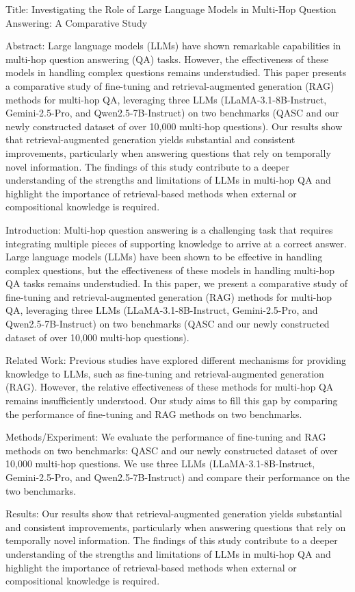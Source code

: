 Title: Investigating the Role of Large Language Models in Multi-Hop Question Answering: A Comparative Study

Abstract:
Large language models (LLMs) have shown remarkable capabilities in multi-hop question answering (QA) tasks. However, the effectiveness of these models in handling complex questions remains understudied. This paper presents a comparative study of fine-tuning and retrieval-augmented generation (RAG) methods for multi-hop QA, leveraging three LLMs (LLaMA-3.1-8B-Instruct, Gemini-2.5-Pro, and Qwen2.5-7B-Instruct) on two benchmarks (QASC and our newly constructed dataset of over 10,000 multi-hop questions). Our results show that retrieval-augmented generation yields substantial and consistent improvements, particularly when answering questions that rely on temporally novel information. The findings of this study contribute to a deeper understanding of the strengths and limitations of LLMs in multi-hop QA and highlight the importance of retrieval-based methods when external or compositional knowledge is required.

Introduction:
Multi-hop question answering is a challenging task that requires integrating multiple pieces of supporting knowledge to arrive at a correct answer. Large language models (LLMs) have been shown to be effective in handling complex questions, but the effectiveness of these models in handling multi-hop QA tasks remains understudied. In this paper, we present a comparative study of fine-tuning and retrieval-augmented generation (RAG) methods for multi-hop QA, leveraging three LLMs (LLaMA-3.1-8B-Instruct, Gemini-2.5-Pro, and Qwen2.5-7B-Instruct) on two benchmarks (QASC and our newly constructed dataset of over 10,000 multi-hop questions).

Related Work:
Previous studies have explored different mechanisms for providing knowledge to LLMs, such as fine-tuning and retrieval-augmented generation (RAG). However, the relative effectiveness of these methods for multi-hop QA remains insufficiently understood. Our study aims to fill this gap by comparing the performance of fine-tuning and RAG methods on two benchmarks.

Methods/Experiment:
We evaluate the performance of fine-tuning and RAG methods on two benchmarks: QASC and our newly constructed dataset of over 10,000 multi-hop questions. We use three LLMs (LLaMA-3.1-8B-Instruct, Gemini-2.5-Pro, and Qwen2.5-7B-Instruct) and compare their performance on the two benchmarks.

Results:
Our results show that retrieval-augmented generation yields substantial and consistent improvements, particularly when answering questions that rely on temporally novel information. The findings of this study contribute to a deeper understanding of the strengths and limitations of LLMs in multi-hop QA and highlight the importance of retrieval-based methods when external or compositional knowledge is required.

